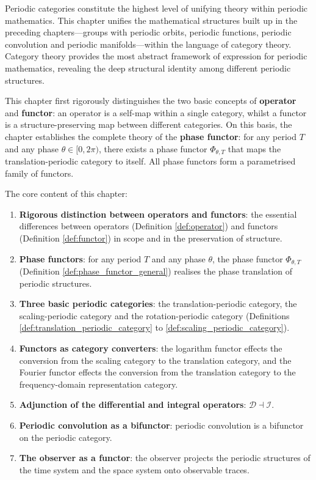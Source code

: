 \begin{remark}\label{rem:periodic_category_chapter_positioning}
Periodic categories constitute the highest level of unifying theory within periodic mathematics. This chapter unifies the mathematical structures built up in the preceding chapters---groups with periodic orbits, periodic functions, periodic convolution and periodic manifolds---within the language of category theory. Category theory provides the most abstract framework of expression for periodic mathematics, revealing the deep structural identity among different periodic structures.

This chapter first rigorously distinguishes the two basic concepts of \textbf{operator} and \textbf{functor}: an operator is a self-map within a single category, whilst a functor is a structure-preserving map between different categories. On this basis, the chapter establishes the complete theory of the \textbf{phase functor}: for any period $T$ and any phase $\theta \in [0, 2\pi)$, there exists a phase functor $\Phi_{\theta, T}$ that maps the translation-periodic category to itself. All phase functors form a parametrised family of functors.

The core content of this chapter:
\begin{enumerate}[label=(\arabic*)]
    \item \textbf{Rigorous distinction between operators and functors}: the essential differences between operators (Definition \ref{def:operator}) and functors (Definition \ref{def:functor}) in scope and in the preservation of structure.
    \item \textbf{Phase functors}: for any period $T$ and any phase $\theta$, the phase functor $\Phi_{\theta, T}$ (Definition \ref{def:phase_functor_general}) realises the phase translation of periodic structures.
    \item \textbf{Three basic periodic categories}: the translation-periodic category, the scaling-periodic category and the rotation-periodic category (Definitions \ref{def:translation_periodic_category} to \ref{def:scaling_periodic_category}).
    \item \textbf{Functors as category converters}: the logarithm functor effects the conversion from the scaling category to the translation category, and the Fourier functor effects the conversion from the translation category to the frequency-domain representation category.
    \item \textbf{Adjunction of the differential and integral operators}: $\mathcal{D} \dashv \mathcal{I}$.
    \item \textbf{Periodic convolution as a bifunctor}: periodic convolution is a bifunctor on the periodic category.
    \item \textbf{The observer as a functor}: the observer projects the periodic structures of the time system and the space system onto observable traces.
\end{enumerate}


\end{remark}
